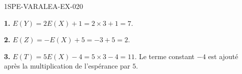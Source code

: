 \begin{corrige}{1SPE-VARALEA-EX-020}

\textbf{1.} $E(Y) = 2E(X)+1 = 2 \times 3 + 1 = 7$.

\medskip
\textbf{2.} $E(Z)=-E(X)+5=-3+5=2$.

\medskip
\textbf{3.} $E(T)=5E(X)-4=5\times3-4=11$. Le terme constant
$-4$ est ajouté après la multiplication de l'espérance par $5$.

\end{corrige}
